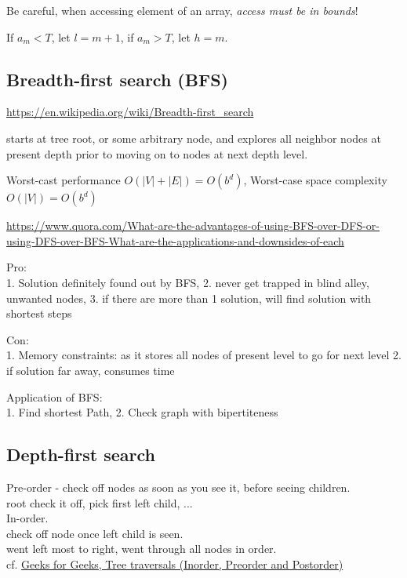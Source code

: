 \documentclass[10pt]{amsart}
\begin{document}
Be careful, when accessing element of an array, \emph{access must be in bounds}!

If $a_m < T$, let $l= m + 1$, if $a_m > T$, let $h=m$.


\subsection{Breadth-first search (BFS)}

\url{https://en.wikipedia.org/wiki/Breadth-first_search}

starts at tree root, or some arbitrary node, and explores all neighbor nodes at present depth prior to moving on to nodes at next depth level.

Worst-cast performance $O(|V|+|E|) = O(b^d)$, Worst-case space complexity $O(|V|) = O(b^d)$

\url{https://www.quora.com/What-are-the-advantages-of-using-BFS-over-DFS-or-using-DFS-over-BFS-What-are-the-applications-and-downsides-of-each}

Pro: \\
1. Solution definitely found out by BFS, 2. never get trapped in blind alley, unwanted nodes, 3. if there are more than 1 solution, will find solution with shortest steps

Con: \\
1. Memory constraints: as it stores all nodes of present level to go for next level
2. if solution far away, consumes time

Application of BFS: \\
1. Find shortest Path,
2. Check graph with bipertiteness

\subsection{Depth-first search}

Pre-order - check off nodes as soon as you see it, before seeing children. \\
root check it off, pick first left child, ... \\

In-order. \\
check off node once left child is seen. \\
went left most to right, went through all nodes in order. \\

cf. \href{https://www.geeksforgeeks.org/tree-traversals-inorder-preorder-and-postorder/}{Geeks for Geeks, Tree traversals (Inorder, Preorder and Postorder)}
\end{document}
